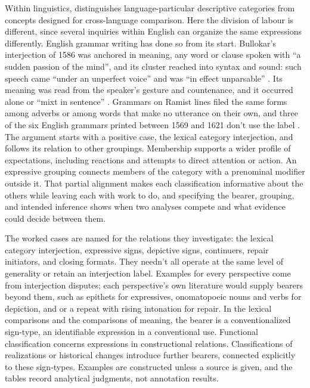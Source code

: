 \documentclass[12pt]{article}
\begin{document}
Within linguistics, \textcite[663, 666, 680]{haspelmath2010} distinguishes
language-particular descriptive categories from concepts designed for
cross-language comparison. Here the division of labour is different, since
several inquiries within English can organize the same expressions
differently. English grammar writing has done so from its start.
Bullokar's interjection of 1586 was anchored in meaning, any word or
clause spoken with \enquote{a sudden passion of the mind}, and its
cluster reached into syntax and sound: such speech came \enquote{under
an unperfect voice} and was \enquote{in effect unparsable}
\citep[350]{bullokar1586}.
Its meaning was read from the speaker's gesture and countenance, and it
occurred alone or \enquote{mixt in sentence} \citep[373]{bullokar1586}.
Grammars on Ramist lines filed the same forms among adverbs or among
words that make no utterance on their own, and three of the six English
grammars printed between 1569 and 1621 don't use the label
\citep[483--485]{bagli2026}. The argument starts with a positive case, the lexical
category interjection, and follows its relation to other groupings.
Membership supports a wider profile of expectations, including reactions
and attempts to direct attention or action. An expressive grouping connects
members of the category with a prenominal modifier outside it. That partial
alignment makes each classification informative about the others while
leaving each with work to do, and specifying the bearer, grouping, and
intended inference shows when two analyses compete and what evidence could
decide between them.

The worked cases are named for the relations they investigate: the
lexical category interjection, expressive signs, depictive signs, continuers, repair
initiators, and closing formats. They needn't all operate at the same level
of generality or retain an interjection label. Examples for every
perspective come from interjection disputes; each perspective's own
literature would supply bearers beyond them, such as epithets for
expressives, onomatopoeic nouns and verbs for depiction, and
 or a repeat with rising intonation for repair. In the lexical comparisons
and the comparisons of meaning, the bearer is a conventionalized sign-type,
an identifiable expression in a conventional use. Functional classification
concerns expressions in constructional relations. Classifications of
realizations or historical changes introduce further bearers, connected
explicitly to these sign-types. Examples are constructed unless a source is
given, and the tables record analytical judgments, not annotation results.
\end{document}

